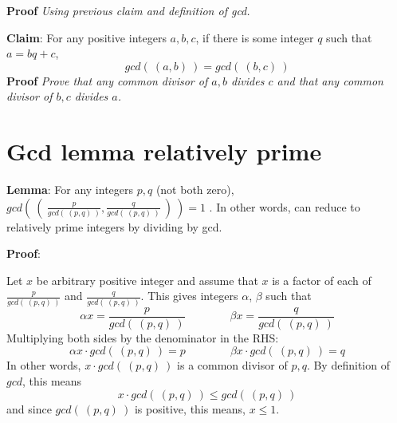 \documentclass[12pt, oneside]{article}
\begin{document}
{\bf Proof} {\it Using previous claim and definition of gcd.}

\vspace{150pt}


{\bf Claim}: For any positive integers $a,b,c$, if there is some integer $q$ such that $a = bq + c$,
\[
    gcd(~(a,b)~) = gcd (~(b,c)~)
\]
{\bf Proof} {\it Prove that any common divisor of $a,b$ divides $c$ and that any common 
divisor of $b,c$ divides $a$.}

\vspace{150pt}
 \vfill
\section*{Gcd lemma relatively prime}


{\bf Lemma}: For any integers $p, q$ (not both zero), 
$gcd \left(~ \left(~\frac{p}{gcd(~(p,q)~)}, \frac{q}{gcd(~(p,q)~)} ~\right) ~\right) = 1$ .
In other words, can reduce to relatively prime integers by dividing by gcd.

{\bf Proof}:

Let $x$ be arbitrary positive integer and assume that $x$ is a 
factor of each of $\frac{p}{gcd(~(p,q)~)}$ and $\frac{q}{gcd(~(p,q)~)}$. 
This gives integers $\alpha$, $\beta$ such that 
\[
    \alpha x = \frac{p}{gcd(~(p,q)~)} \qquad \qquad \beta x = \frac{q}{gcd(~(p,q)~)}
\]
Multiplying both sides by the denominator in the RHS: 
\[
    \alpha x \cdot gcd(~(p,q)~)= p \qquad \qquad \beta x \cdot gcd(~(p,q)~)= q
\]
In other words, $x \cdot gcd(~(p,q)~)$ is a common divisor of $p, q$. By definition of $gcd$, this means
\[
    x \cdot gcd (~(p,q)~) \leq gcd (~(p,q)~)
\]
and since $gcd(~(p,q)~)$ is positive, this means, $x \leq 1$.
\vspace{350pt}
 \vfill
\end{document}
